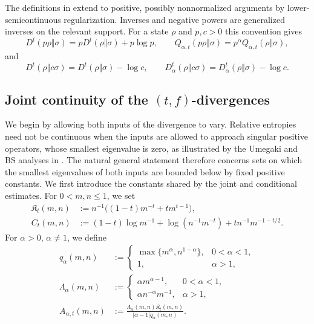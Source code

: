 \documentclass[11pt]{article}
\theoremstyle{remark}
\newcommand{\1}{\mathbbm{1}}
\begin{document}
The definitions in  extend to
positive, possibly nonnormalized arguments by lower-semicontinuous
regularization.  Inverses and negative powers are generalized
inverses on the relevant support.  For a state $\rho$ and $p,c>0$
this convention gives
\begin{equation}
 D^t(p\rho\Vert\sigma)
 =pD^t(\rho\Vert\sigma)+p\log p,
 \qquad
 Q_{\alpha,t}(p\rho\Vert\sigma)
 =p^\alpha Q_{\alpha,t}(\rho\Vert\sigma),
 \label{eq:conditional-first-input-scaling}
\end{equation}
and
\begin{equation}
 D^t(\rho\Vert c\sigma)=D^t(\rho\Vert\sigma)-\log c,
 \qquad
 D_\alpha^t(\rho\Vert c\sigma)
 =D_\alpha^t(\rho\Vert\sigma)-\log c.
 \label{eq:conditional-scaling-convention}
\end{equation}

\subsection{Joint continuity of the
\texorpdfstring{$(t,f)$}{(t,f)}-divergences}
\label{subsec:joint-continuity-tf}

We begin by allowing both inputs of the divergence to vary.  Relative
entropies need not be continuous when the inputs are allowed to approach
singular positive operators, whose smallest eigenvalue is zero, as
illustrated by the Umegaki and BS analyses in
\cite[Sections~5.3 and~6.2]{bluhm2023continuity}.  The
natural general statement therefore concerns sets on which the
smallest eigenvalues of both inputs are bounded below by fixed
positive constants.  We first introduce the constants shared by the
joint and conditional estimates.  For $0<m,n\leq1$, we set
\begin{align}
 \mathfrak K_t(m,n)
 &:=n^{-1}\bigl((1-t)m^{-t}+tm^{t-1}\bigr),
 \label{eq:continuity-frak-Kt}\\
 C_t(m,n)
 &:=(1-t)\log m^{-1}
 +\log(n^{-1}m^{-t})+tn^{-1}m^{-1-t/2}.
 \label{eq:continuity-Ct}
\end{align}
For $\alpha>0$, $\alpha\neq1$, we define
\begin{align}
 q_\alpha(m,n)
 &:={}
 \begin{cases}
  \max\{m^\alpha,n^{1-\alpha}\},&0<\alpha<1,\\
  1,&\alpha>1,
 \end{cases}
 \label{eq:continuity-qalpha}\\
 \Lambda_\alpha(m,n)
 &:={}
 \begin{cases}
  \alpha m^{\alpha-1},&0<\alpha<1,\\
  \alpha n^{-\alpha}m^{-1},&\alpha>1,
 \end{cases}
 \label{eq:continuity-Lambda-alpha}\\
 A_{\alpha,t}(m,n)
 &:=\frac{\Lambda_\alpha(m,n)\mathfrak K_t(m,n)}
          {|\alpha-1|q_\alpha(m,n)}.
 \label{eq:continuity-A-alpha-t}
\end{align}
\end{document}
